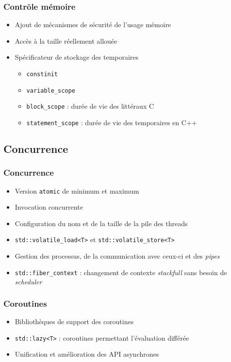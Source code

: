 \documentclass[C++.tex]{subfiles}
\begin{document}
\begin{frame}[fragile]
	\frametitle{Contrôle mémoire}
	\begin{itemize}
		\item Ajout de mécanismes de sécurité de l'usage mémoire


		\item Accès à la taille réellement allouée
		\item Spécificateur de stockage des temporaires 
		\begin{itemize}
			\item \lstinline|constinit|
			\item \lstinline|variable_scope|
			\item \lstinline|block_scope| : durée de vie des littéraux C
			\item \lstinline|statement_scope| : durée de vie des temporaires en C++
		\end{itemize}
	\end{itemize}
\end{frame}

\subsection*{Concurrence}
\begin{frame}[fragile]
	\frametitle{Concurrence}
	\begin{itemize}
		\item Version \lstinline|atomic| de minimum et maximum
		\item Invocation concurrente
		\item Configuration du nom et de la taille de la pile des threads
		\item \lstinline|std::volatile_load<T>| et \lstinline|std::volatile_store<T>|
		\item Gestion des processus, de la communication avec ceux-ci et des \textit{pipes}
		\item \lstinline|std::fiber_context| : changement de contexte \textit{stackfull} sans besoin de \textit{scheduler}
	\end{itemize}
\end{frame}

\begin{frame}[fragile]
	\frametitle{Coroutines}
	\begin{itemize}
		\item Bibliothèques de support des coroutines
		\item \lstinline|std::lazy<T>| : coroutines permettant l'évaluation différée
		\item Unification et amélioration des API asynchrones

	\end{itemize}
\end{frame}
\end{document}
